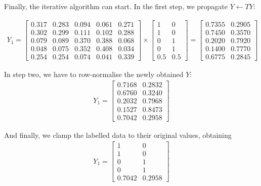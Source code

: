 \begin{example}
    Finally, the iterative algorithm can start. In the first step, we propagate $Y \xleftarrow{} TY$:
    
    \begin{align*}
        Y_1 =
        \begin{bmatrix}
            0.317 & 0.283 & 0.094 & 0.061 & 0.271 \\
            0.302 & 0.299 & 0.111 & 0.102 & 0.288 \\
            0.079 & 0.089 & 0.370 & 0.388 & 0.068 \\
            0.048 & 0.075 & 0.352 & 0.408 & 0.034 \\
            0.254 & 0.254 & 0.074 & 0.041 & 0.339
        \end{bmatrix}
        \times
        \begin{bmatrix}
            1   & 0 \\
            1   & 0 \\
            0   & 1 \\
            0   & 1 \\
            0.5 & 0.5 
        \end{bmatrix}
        = 
        \begin{bmatrix}
            0.7355 & 0.2905 \\
            0.7450 & 0.3570 \\
            0.2020 & 0.7920 \\
            0.1400 & 0.7770 \\
            0.6775 & 0.2845
        \end{bmatrix}
    \end{align*}
    
    In step two, we have to row-normalise the newly obtained $Y$:
    \begin{align*}
        Y_1 =
        \begin{bmatrix}
            0.7168 & 0.2832 \\
            0.6760 & 0.3240 \\
            0.2032 & 0.7968 \\
            0.1527 & 0.8473 \\
            0.7042 & 0.2958
        \end{bmatrix}
    \end{align*}
    
    And finally, we clamp the labelled data to their original values, obtaining
    \begin{align*}
        Y_1 =
        \begin{bmatrix}
            1      & 0      \\
            1      & 0      \\
            0      & 1      \\
            0      & 1      \\
            0.7042 & 0.2958
        \end{bmatrix}
    \end{align*}
    

\end{example}
